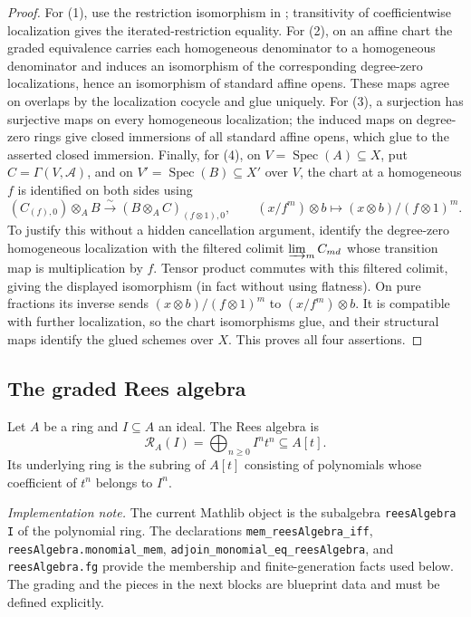 \begin{proof}
  For (1), use the restriction isomorphism in
  ; transitivity of coefficientwise
  localization gives the iterated-restriction equality.  For (2), on an affine
  chart the graded equivalence carries each homogeneous denominator to a
  homogeneous denominator and induces an isomorphism of the corresponding
  degree-zero localizations, hence an isomorphism of standard affine opens.
  These maps agree on overlaps by the localization cocycle and glue uniquely.
  For (3), a surjection has surjective maps on every homogeneous localization;
  the induced maps on degree-zero rings give closed immersions of all standard
  affine opens, which glue to the asserted closed immersion.  Finally, for
  (4), on $V=\operatorname{Spec}(A)\subseteq X$, put
  $C=\Gamma(V,\mathcal A)$, and on
  $V'=\operatorname{Spec}(B)\subseteq X'$ over $V$, the chart at a
  homogeneous $f$ is identified on both sides using
  \[
    (C_{(f),0})\otimes_A B
      \xrightarrow{\sim}(B\otimes_A C)_{(f\otimes1),0},
    \qquad (x/f^m)\otimes b\longmapsto (x\otimes b)/(f\otimes1)^m .
  \]
  To justify this without a hidden cancellation argument, identify the
  degree-zero homogeneous localization with the filtered colimit
  $\varinjlim_m C_{md}$ whose transition map is multiplication by $f$.
  Tensor product commutes with this filtered colimit, giving the displayed
  isomorphism (in fact without using flatness).  On pure fractions its inverse
  sends $(x\otimes b)/(f\otimes1)^m$ to $(x/f^m)\otimes b$.  It is compatible
  with further localization, so the chart isomorphisms glue, and their
  structural maps identify the glued schemes over $X$.  This proves all four
  assertions.
\end{proof}

\subsection{The graded Rees algebra}

\begin{definition}
  \label{def:nagata-rees-algebra}
  \leanok

  Let $A$ be a ring and $I\subseteq A$ an ideal.  The Rees algebra is
  \[
    \mathcal R_A(I)=\bigoplus_{n\geq 0}I^nt^n\subseteq A[t].
  \]
  Its underlying ring is the subring of $A[t]$ consisting of polynomials whose
  coefficient of $t^n$ belongs to $I^n$.

  \emph{Implementation note.}  The current Mathlib object is the subalgebra
  \texttt{reesAlgebra I} of the polynomial ring.  The declarations
  \texttt{mem\_reesAlgebra\_iff}, \texttt{reesAlgebra.monomial\_mem},
  \texttt{adjoin\_monomial\_eq\_reesAlgebra}, and
  \texttt{reesAlgebra.fg} provide the membership and finite-generation facts
  used below.  The grading and the pieces in the next blocks are blueprint
  data and must be defined explicitly.
\end{definition}

